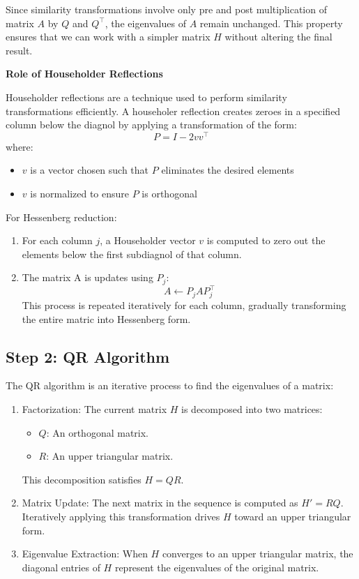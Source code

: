 \documentclass{article}
\begin{document}
Since similarity transformations involve only pre and post multiplication of matrix $A$ by $Q$ and $Q^\top$, the eigenvalues of $A$ remain unchanged. This property ensures that we can work with a simpler matrix $H$ without altering the final result.

\textbf{Role of Householder Reflections}

Householder reflections are a technique used to perform similarity transformations efficiently. A householer reflection creates zeroes in a specified column below the diagnol by applying a transformation of the form:
\[
P = I-2vv^\top
\]
where:
\begin{itemize}
    \item $v$ is a vector chosen such that $P$ eliminates the desired elements
    \item $v$ is normalized to ensure $P$ is orthogonal
\end{itemize}

For Hessenberg reduction:
\begin{enumerate}
    \item For each column $j$, a Householder vector $v$ is computed to zero out the elements below the first subdiagnol of that column.
    \item The matrix A is updates using $P_j$:
    \[
    A \leftarrow P_jAP_j^\top
    \]
    This process is repeated iteratively for each column, gradually transforming the entire matric into Hessenberg form.
\end{enumerate}
\subsection{ Step 2: QR Algorithm}
The QR algorithm is an iterative process to find the eigenvalues of a matrix:
\begin{enumerate}
\item Factorization: The current matrix \( H \) is decomposed into two matrices:
\begin{itemize}
   \item \( Q \): An orthogonal matrix.
   \item \( R \): An upper triangular matrix.
\end{itemize}
This decomposition satisfies \( H = QR \).
   
\item Matrix Update:
   The next matrix in the sequence is computed as \( H' = RQ \). Iteratively applying this transformation drives \( H \) toward an upper triangular form.

\item Eigenvalue Extraction:
   When \( H \) converges to an upper triangular matrix, the diagonal entries of \( H \) represent the eigenvalues of the original matrix.
\end{enumerate}
\end{document}
